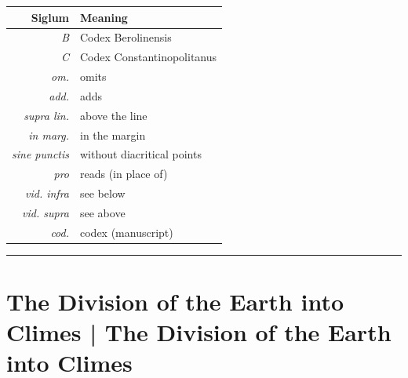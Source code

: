 \documentclass[11pt,a4paper]{article}
\begin{document}
\begin{center}
\begin{longtable}{rl}
\toprule
\textbf{Siglum} & \textbf{Meaning} \\
\midrule
\endhead
\textit{B} & Codex Berolinensis \\
\textit{C} & Codex Constantinopolitanus \\
\textit{om.} & omits \\
\textit{add.} & adds \\
\textit{supra lin.} & above the line \\
\textit{in marg.} & in the margin \\
\textit{sine punctis} & without diacritical points \\
\textit{pro} & reads (in place of) \\
\textit{vid. infra} & see below \\
\textit{vid. supra} & see above \\
\textit{cod.} & codex (manuscript) \\
\bottomrule
\end{longtable}
\end{center}

\vspace{0.3cm}

\begin{center}
\rule{0.5\textwidth}{0.6pt}
\end{center}

\clearpage

\tableofcontents
\clearpage


\section{The Division of the Earth into Climes | The Division of the Earth into Climes}
\end{document}
